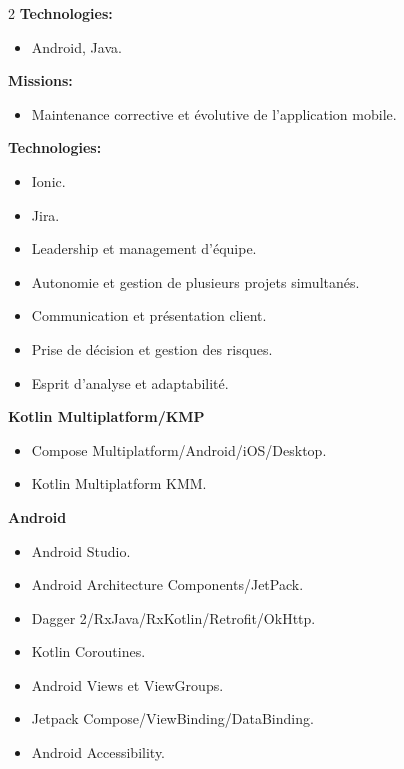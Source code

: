 \documentclass[10pt,a4paper,withhyper]{altacv}
\begin{document}
\begin{paracol}{2}
	\textbf{Technologies:}	
\begin{itemize}
	\addtolength{\itemindent}{0.1cm}
	\item Android, Java.
	
\end{itemize}

\divider


\textbf{Missions:}

\begin{itemize}
	\addtolength{\itemindent}{0.1cm}
	\item Maintenance corrective et évolutive de l’application mobile.
\end{itemize}
	\textbf{Technologies:}	
\begin{itemize}
	\addtolength{\itemindent}{0.1cm}
	\item Ionic.
	\item Jira.
\end{itemize}


\switchcolumn



\begin{itemize}
	\item Leadership et management d'équipe.
	\item Autonomie et gestion de plusieurs projets simultanés.
	\item Communication et présentation client.
	\item Prise de décision et gestion des risques.
	\item Esprit d’analyse et adaptabilité.
\end{itemize}




\textbf{Kotlin Multiplatform/KMP}

\begin{itemize}
	\item Compose Multiplatform/Android/iOS/Desktop.
	\item Kotlin Multiplatform KMM.
\end{itemize}
\divider

\textbf{Android}

\begin{itemize}
	\item Android Studio.
	\item Android Architecture Components/JetPack.
	\item Dagger 2/RxJava/RxKotlin/Retrofit/OkHttp.
	\item Kotlin Coroutines.
	\item Android Views et ViewGroups.
	\item Jetpack Compose/ViewBinding/DataBinding.
	\item Android Accessibility.
\end{itemize}
\divider


\end{paracol}
\end{document}
